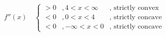 \begin{example}
\begin{enumerate}
        \[ f''(x) \quad \left\{
 	\begin{array}{lll}
	  >0 &, 4 <x <\infty 	 	& \text{, strictly convex} \\
	  <0 &, 0<x<4         & \text{, strictly concave} \\
	  <0 &, -\infty<x<0             & \text{, strictly concave} 
 	\end{array}
         \right.
         \]
\end{enumerate}
\end{example}
